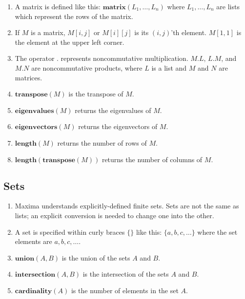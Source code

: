 \documentclass[12pt,leqno]{article}
\begin{document}
\begin{enumerate}

\item A matrix is defined like this: $\mathbf{matrix}(L_1, \ldots, L_n)$
    where $L_1, \ldots, L_n$ are lists which represent the rows of the matrix.

\item If $M$ is a matrix, $M[i, j]$ or $M[i][j]$ is its $(i, j)$'th element.
    $M[1,1]$ is the element at the upper left corner.

\item The operator $\mathbf{.}$ represents noncommutative multiplication.
    $M . L$, $L . M$, and $M . N$ are noncommutative products,
    where $L$ is a list and $M$ and $N$ are matrices.


\item $\mathbf{transpose}(M)$ is the transpose of $M$.

\item $\mathbf{eigenvalues}(M)$ returns the eigenvalues of $M$.

\item $\mathbf{eigenvectors}(M)$ returns the eigenvectors of $M$.

\item $\mathbf{length}(M)$ returns the number of rows of $M$.

\item $\mathbf{length}(\mathbf{transpose}(M))$ returns the number of columns of $M$.

\end{enumerate}

\subsection{Sets}

\begin{enumerate}

\item Maxima understands explicitly-defined finite sets.
    Sets are not the same as lists; an explicit conversion is needed to change one into the other.

\item A set is specified within curly braces $\{ \}$ like this:
    $\{a, b, c, \ldots\}$ where the set elements are $a, b, c, \ldots$.

\item $\mathbf{union} (A, B)$ is the union of the sets $A$ and $B$.

\item $\mathbf{intersection} (A, B)$ is the intersection of the sets $A$ and $B$.

\item $\mathbf{cardinality} (A)$ is the number of elements in the set $A$.

\end{enumerate}
\end{document}
